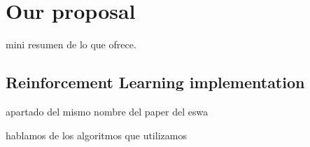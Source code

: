 

\section{Our proposal}\label{sec:spacerl-proposal}
mini resumen de lo que ofrece.


\subsection{Reinforcement Learning implementation}\label{sec:spacerl-rlimplementation}
apartado del mismo nombre del paper del eswa

hablamos de los algoritmos que utilizamos


